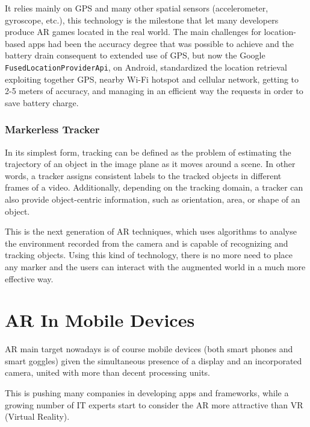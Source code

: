 			It relies mainly on GPS and many other spatial sensors (accelerometer, gyroscope, etc.), this technology is the milestone that let many developers produce AR games located in the real world.
			The main challenges for location-based apps had been the accuracy degree that was possible to achieve and the battery drain consequent to extended use of GPS, but now the Google \lstinline|FusedLocationProviderApi|, on Android, standardized the location retrieval exploiting together GPS, nearby Wi-Fi hotspot and cellular network, getting to 2-5 meters of accuracy, and managing in an efficient way the requests in order to save battery charge. %

		\subsubsection{Markerless Tracker}
			
			\begin{quoting}
				In its simplest form, tracking can be defined as the problem of estimating the trajectory of an object in the image plane as it moves around a scene. In other words, a tracker assigns consistent labels to the tracked objects in different frames of a video. Additionally, depending on the tracking domain, a tracker can also provide object-centric information, such as orientation, area, or shape of an object.~\cite{ylmaz:tracking}
			\end{quoting}
			
			This is the next generation of AR techniques, which uses algorithms to analyse the environment recorded from the camera and is capable of recognizing and tracking objects. Using this kind of technology, there is no more need to place any marker and the users can interact with the augmented world in a much more effective way.
			
	
	\section{AR In Mobile Devices}
	
		AR main target nowadays is of course mobile devices (both smart phones and smart goggles) given the simultaneous presence of a display and an incorporated camera, united with more than decent processing units.
		
		This is pushing many companies in developing apps and frameworks, while a growing number of IT experts start to consider the AR more attractive than VR (Virtual Reality).
		
